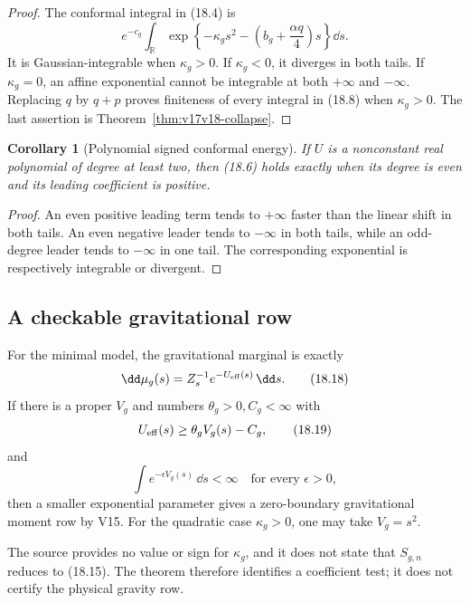 \documentclass[11pt]{article}
\newtheorem{corollary}[theorem]{Corollary}
\theoremstyle{remark}
\begin{document}
\begin{proof}
The conformal integral in (18.4) is
\[
 e^{-c_g}\int_{\mathbb R}
 \exp\left\{-\kappa_gs^2-
 \left(b_g+\frac{\alpha q}{4}\right)s\right\}\dd s. \tag{18.17}
\]
It is Gaussian-integrable when \(\kappa_g>0\).  If
\(\kappa_g<0\), it diverges in both tails.  If \(\kappa_g=0\), an
affine exponential cannot be integrable at both \(+\infty\) and
\(-\infty\).  Replacing \(q\) by \(q+p\) proves finiteness of every
integral in (18.8) when \(\kappa_g>0\).  The last assertion is
Theorem~\ref{thm:v17v18-collapse}.
\end{proof}

\begin{corollary}[Polynomial signed conformal energy]
\label{cor:v17v18-polynomial}
If \(U\) is a nonconstant real polynomial of degree at least two,
then (18.6) holds exactly when its degree is even and its leading
coefficient is positive.
\end{corollary}

\begin{proof}
An even positive leading term tends to \(+\infty\) faster than the
linear shift in both tails.  An even negative leader tends to
\(-\infty\) in both tails, while an odd-degree leader tends to
\(-\infty\) in one tail.  The corresponding exponential is
respectively integrable or divergent.
\end{proof}

\subsection{A checkable gravitational row}

For the minimal model, the gravitational marginal is exactly
\[
 \dd\mu_g(s)
 =Z_s^{-1}
 e^{-U_{\rm eff}(s)}\,\dd s.                       \tag{18.18}
\]
If there is a proper \(V_g\) and numbers
\(\theta_g>0,C_g<\infty\) with
\[
 U_{\rm eff}(s)\geq
 \theta_gV_g(s)-C_g,                               \tag{18.19}
\]
and
\[
 \int e^{-\epsilon V_g(s)}\,\dd s<\infty
 \quad\text{for every }\epsilon>0,                 \tag{18.20}
\]
then a smaller exponential parameter gives a zero-boundary
gravitational moment row by V15.  For the quadratic case
\(\kappa_g>0\), one may take \(V_g=s^2\).

The source provides no value or sign for \(\kappa_g\), and it does
not state that \(S_{g,n}\) reduces to (18.15).  The theorem therefore
identifies a coefficient test; it does not certify the physical
gravity row.
\end{document}
